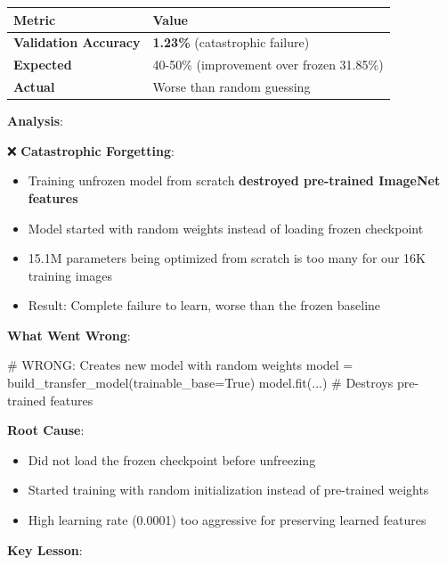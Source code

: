 \documentclass[
  letterpaper,
  DIV=11,
  numbers=noendperiod]{scrartcl}
\newenvironment{Shaded}{\begin{snugshade}}{\end{snugshade}}
\newcommand{\CommentTok}[1]{\textcolor[rgb]{0.37,0.37,0.37}{#1}}
\newcommand{\NormalTok}[1]{\textcolor[rgb]{0.00,0.23,0.31}{#1}}
\newcommand{\OperatorTok}[1]{\textcolor[rgb]{0.37,0.37,0.37}{#1}}
\newcommand{\VariableTok}[1]{\textcolor[rgb]{0.07,0.07,0.07}{#1}}
\providecommand{\tightlist}{%
  \setlength{\itemsep}{0pt}\setlength{\parskip}{0pt}}
\renewenvironment{Shaded}{%
  \begin{tcolorbox}[%
    enhanced,%
    colback=codebg,%
    colframe=codebg,%
    borderline west={3pt}{0pt}{sectionblue},%
    boxrule=0pt,%
    arc=0pt,%
    boxsep=5pt,%
    left=2mm,%
    right=2mm,%
    top=2mm,%
    bottom=2mm%
  ]%
}{%
  \end{tcolorbox}%
}
\begin{document}
\begin{longtable}[]{@{}ll@{}}
\toprule\noalign{}
Metric & Value \\
\midrule\noalign{}
\endhead
\bottomrule\noalign{}
\endlastfoot
\textbf{Validation Accuracy} & \textbf{1.23\%} (catastrophic failure) \\
\textbf{Expected} & 40-50\% (improvement over frozen 31.85\%) \\
\textbf{Actual} & Worse than random guessing \\
\end{longtable}

\textbf{Analysis}:

❌ \textbf{Catastrophic Forgetting}:

\begin{itemize}
\tightlist
\item
  Training unfrozen model from scratch \textbf{destroyed pre-trained
  ImageNet features}
\item
  Model started with random weights instead of loading frozen checkpoint
\item
  15.1M parameters being optimized from scratch is too many for our 16K
  training images
\item
  Result: Complete failure to learn, worse than the frozen baseline
\end{itemize}

\textbf{What Went Wrong}:

\begin{Shaded}
\begin{Highlighting}[]
\CommentTok{\# WRONG: Creates new model with random weights}
\NormalTok{model }\OperatorTok{=}\NormalTok{ build\_transfer\_model(trainable\_base}\OperatorTok{=}\VariableTok{True}\NormalTok{)}
\NormalTok{model.fit(...)  }\CommentTok{\# Destroys pre{-}trained features}
\end{Highlighting}
\end{Shaded}

\textbf{Root Cause}:

\begin{itemize}
\tightlist
\item
  Did not load the frozen checkpoint before unfreezing
\item
  Started training with random initialization instead of pre-trained
  weights
\item
  High learning rate (0.0001) too aggressive for preserving learned
  features
\end{itemize}

\textbf{Key Lesson}:
\end{document}
